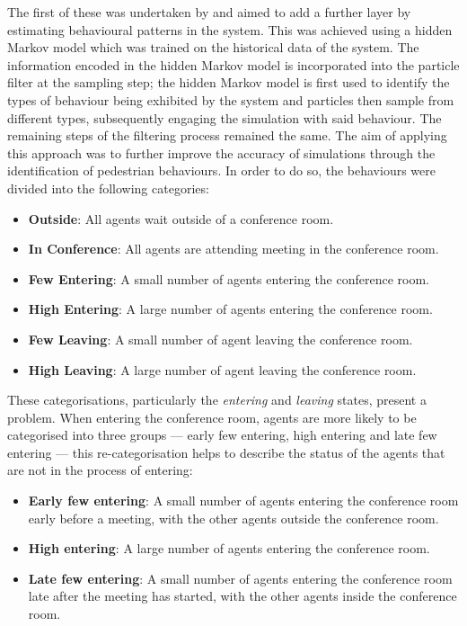 The first of these was undertaken by \citet{rai2013behavior} and aimed to add a
further layer by estimating behavioural patterns in the system.
This was achieved using a hidden Markov model which was trained on the
historical data of the system.
The information encoded in the hidden Markov model is incorporated into the
particle filter at the sampling step; the hidden Markov model is first used to
identify the types of behaviour being exhibited by the system and particles then
sample from different types, subsequently engaging the simulation with said
behaviour.
The remaining steps of the filtering process remained the same.
The aim of applying this approach was to further improve the accuracy of
simulations through the identification of pedestrian behaviours.
In order to do so, the behaviours were divided into the following categories:
\begin{itemize}
    \item \textbf{Outside}: All agents wait outside of a conference room.
    \item \textbf{In Conference}: All agents are attending meeting in the
        conference room.
    \item \textbf{Few Entering}: A small number of agents entering the
        conference room.
    \item \textbf{High Entering}: A large number of agents entering the
        conference room.
    \item \textbf{Few Leaving}: A small number of agent leaving the conference
        room.
    \item \textbf{High Leaving}: A large number of agent leaving the conference
        room.
\end{itemize}
These categorisations, particularly the \textit{entering} and \textit{leaving}
states, present a problem.
When entering the conference room, agents are more likely to be categorised
into three groups --- early few entering, high entering and late few entering
--- this re-categorisation helps to describe the status of the agents that are
not in the process of entering:
\begin{itemize}
    \item \textbf{Early few entering}: A small number of agents entering the
        conference room early before a meeting, with the other agents outside
        the conference room.
    \item \textbf{High entering}: A large number of agents entering the
        conference room.
    \item \textbf{Late few entering}: A small number of agents entering the
        conference room late after the meeting has started, with the other
        agents inside the conference room.
\end{itemize}
